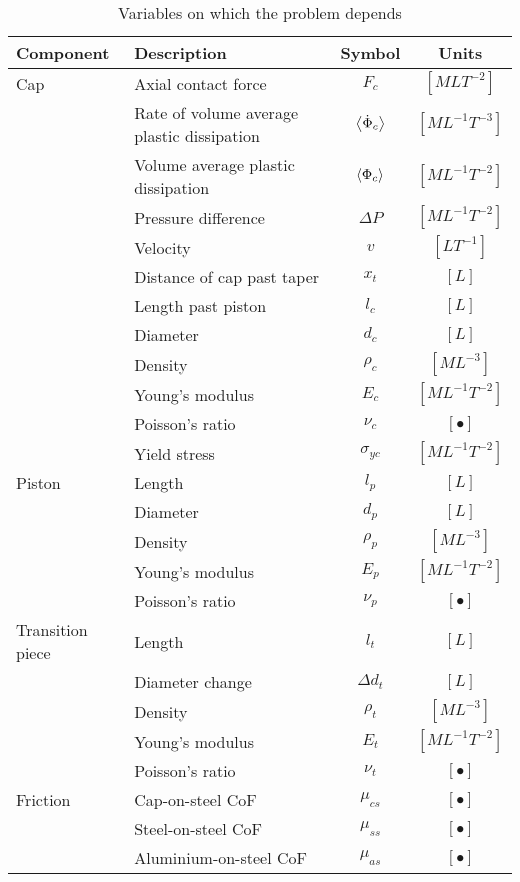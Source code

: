 \documentclass{article}
\begin{document}
\begin{table}[!htb]
	\centering
	\caption{Variables on which the problem depends }
	\label{tab:dimentional units}
	\begin{tabular}{l p{7cm} c c}
		\hline
		Component & Description & Symbol & Units \\
		\hline \hline
		Cap & Axial contact force & $F_{c}$ & $[MLT^{-2}]$ \\
		&Rate of volume average plastic dissipation & $\left<\dot{\Phi}_{c}\right>$ & $[ML^{-1}T^{-3}]$\\
		&Volume average plastic dissipation & $\left<\Phi_{c}\right>$ & $[ML^{-1}T^{-2}]$\\
		& Pressure difference & $\Delta P$ & $[ML^{-1}T^{-2}]$\\
		& Velocity & $v$ & $[LT^{-1}]$\\
		&Distance of cap past taper & $x_{t}$ & $[L]$\\
		&Length past piston & $l_{c}$ & $[L]$\\
		&Diameter & $d_{c}$ & $[L]$\\
		&Density & $\rho_{c}$ & $[ML^{-3}]$\\
		&Young's modulus & $E_{c}$ & $[ML^{-1}T^{-2}]$\\
		&Poisson's ratio & $\nu_{c}$ & $[\bullet]$\\
		&Yield stress & $\sigma_{yc}$ & $[ML^{-1}T^{-2}]$\\
		\hline
		Piston&Length & $l_{p}$ & $[L]$\\
		&Diameter & $d_{p}$ & $[L]$\\
		&Density & $\rho_{p}$ & $[ML^{-3}]$\\
		&Young's modulus & $E_{p}$ & $[ML^{-1}T^{-2}]$\\
		&Poisson's ratio & $\nu_{p}$ & $[\bullet]$\\
		\hline
		Transition piece& Length & $l_{t}$ & $[L]$\\
		& Diameter change & $\Delta d_{t}$ & $[L]$\\
		&Density & $\rho_{t}$ & $[ML^{-3}]$\\
		&Young's modulus & $E_{t}$ & $[ML^{-1}T^{-2}]$\\
		&Poisson's ratio & $\nu_{t}$ & $[\bullet]$\\
		\hline
		Friction & Cap-on-steel CoF & $\mu_{cs}$ & $[\bullet]$\\	
		&Steel-on-steel CoF & $\mu_{ss}$ & $[\bullet]$\\
		&Aluminium-on-steel CoF & $\mu_{as}$ & $[\bullet]$\\	
	\end{tabular}
\end{table}
\end{document}
